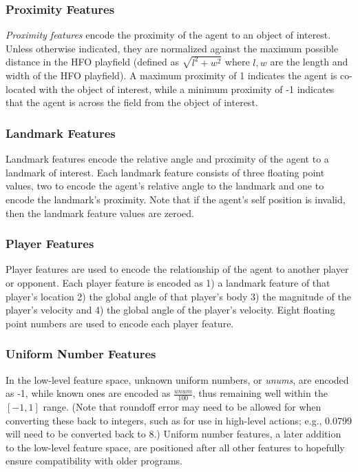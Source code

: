\documentclass[12pt]{article}
\begin{document}
\subsubsection{Proximity Features}
\textit{Proximity features} encode the proximity of the agent to an
object of interest. Unless otherwise indicated, they are normalized
against the maximum possible distance in the HFO playfield (defined as
$\sqrt{l^2 + w^2}$ where $l,w$ are the length and width of the HFO
playfield). A maximum proximity of 1 indicates the agent is co-located
with the object of interest, while a minimum proximity of -1 indicates
that the agent is across the field from the object of interest.

\subsubsection{Landmark Features}
Landmark features encode the relative angle and proximity of the agent
to a landmark of interest. Each landmark feature consists of three
floating point values, two to encode the agent's relative angle to the
landmark and one to encode the landmark's proximity. Note that if the
agent's self position is invalid, then the landmark feature values are
zeroed.

\subsubsection{Player Features}
Player features are used to encode the relationship of the agent to
another player or opponent. Each player feature is encoded as 1) a
landmark feature of that player's location 2) the global angle of that
player's body 3) the magnitude of the player's velocity and 4) the
global angle of the player's velocity. Eight floating point numbers
are used to encode each player feature.

\subsubsection{Uniform Number Features}
In the low-level feature space, unknown uniform numbers, or \textit{unums},
are encoded as -1, while known ones are encoded as $\frac{unum}{100}$, thus
remaining well within the $[-1, 1]$ range. (Note that roundoff error may need
to be allowed for when converting these back to integers, such as for use in
high-level actions; e.g., 0.0799 will need to be converted back to 8.)
Uniform number features, a later addition to the low-level feature space,
are positioned after all other features to hopefully ensure compatibility
with older programs.
\end{document}
